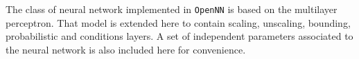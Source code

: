 The class of neural network implemented in \texttt{OpenNN} is based on the multilayer perceptron.  
That model is extended here to contain scaling, unscaling, bounding, probabilistic and conditions layers. 
A set of independent parameters associated to the neural network is also included here for convenience. 
